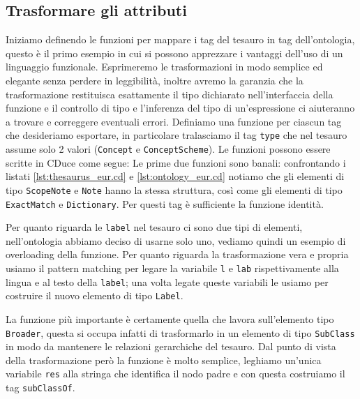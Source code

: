 \subsection{Trasformare gli attributi}
Iniziamo definendo le funzioni per mappare i tag del tesauro in tag dell'ontologia, questo è il primo esempio in cui si possono apprezzare i vantaggi dell'uso di un linguaggio funzionale. Esprimeremo le trasformazioni in modo semplice ed elegante senza perdere in leggibilità, inoltre avremo la garanzia che la trasformazione restituisca esattamente il tipo dichiarato nell'interfaccia della funzione e il controllo di tipo e l'inferenza del tipo di un'espressione ci aiuteranno a trovare e correggere eventuali errori. Definiamo una funzione per ciascun tag che desideriamo esportare, in particolare tralasciamo il tag \verb|type| che nel tesauro assume solo 2 valori (\verb|Concept| e \verb|ConceptScheme|). Le funzioni possono essere scritte in CDuce come segue:
Le prime due funzioni sono banali: confrontando i listati \ref{lst:thesaurus_eur.cd} e \ref{lst:ontology_eur.cd} notiamo che gli elementi di tipo \verb|ScopeNote| e \verb|Note| hanno la stessa struttura, così come gli elementi di tipo \verb|ExactMatch| e \verb|Dictionary|. Per questi tag è sufficiente la funzione identità.

Per quanto riguarda le \verb|label| nel tesauro ci sono due tipi di elementi, nell'ontologia abbiamo deciso di usarne solo uno, vediamo quindi un esempio di overloading della funzione. Per quanto riguarda la trasformazione vera e propria usiamo il pattern matching per legare la variabile \verb|l| e \verb|lab| rispettivamente alla lingua e al testo della \verb|label|; una volta legate queste variabili le usiamo per costruire il nuovo elemento di tipo \verb|Label|.

La funzione più importante è certamente quella che lavora sull'elemento tipo \verb|Broader|, questa si occupa infatti di trasformarlo in un elemento di tipo \verb|SubClass| in modo da mantenere le relazioni gerarchiche del tesauro. Dal punto di vista della trasformazione però la funzione è molto semplice, leghiamo un'unica variabile \verb|res| alla stringa che identifica il nodo padre e con questa costruiamo il tag \verb|subClassOf|.
